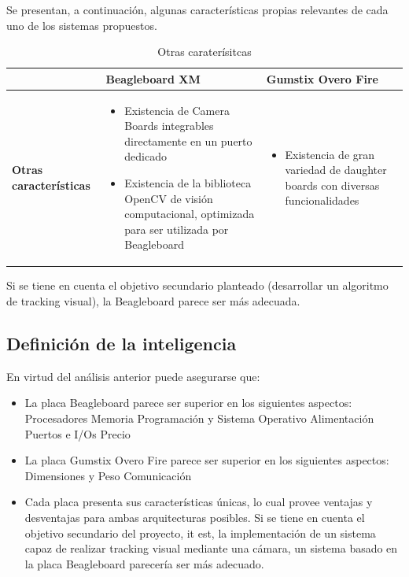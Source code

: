 \documentclass[main]{subfiles}
\begin{document}
Se presentan, a continuaci\'on, algunas caracter\'isticas propias relevantes de cada uno de los sistemas propuestos.

\begin{table}[H]
\begin{tabular}{p{130pt}|p{130pt}|p{130pt}|} 
\cline{2-3}
& \cellcolor[gray]{0.8} \textbf{Beagleboard XM} 
& \cellcolor[gray]{0.8} \textbf{Gumstix Overo Fire} \\ \cline{1-3} \hline
\multicolumn{1}{|p{130pt}|}{\cellcolor[gray]{0.8}\textbf{Otras caracter\'isticas}} 
&\begin{itemize}
\item Existencia de Camera Boards integrables directamente en un puerto dedicado
\item Existencia de la biblioteca OpenCV de visi\'on computacional, optimizada para ser utilizada por Beagleboard
\end{itemize}

&\begin{itemize}
\item Existencia de gran variedad de daughter boards con diversas funcionalidades
\end{itemize}\\ 
\hline 
\end{tabular}
\caption{Otras carater\'isitcas}
\label{tab:otras}
\end{table}

Si se tiene en cuenta el objetivo secundario  planteado (desarrollar un algoritmo de tracking visual), la Beagleboard parece ser m\'as adecuada.

\subsection{Definici\'on de la inteligencia}
\vspace*{15pt}

En virtud del an\'alisis anterior puede asegurarse que:

\begin{itemize}
\item La placa Beagleboard parece ser superior en los siguientes aspectos:
	\subitem Procesadores
	\subitem Memoria
	\subitem Programaci\'on y Sistema Operativo
	\subitem Alimentaci\'on
	\subitem Puertos e I/Os
	\subitem Precio
\item La placa Gumstix Overo Fire parece ser superior en los siguientes aspectos:
	\subitem Dimensiones y Peso
	\subitem Comunicaci\'on
\item Cada placa presenta sus caracter\'isticas \'unicas, lo cual provee ventajas y desventajas para ambas arquitecturas posibles. Si se tiene en cuenta el objetivo secundario del proyecto, it est, la implementaci\'on de un sistema capaz de realizar tracking visual mediante una c\'amara, un sistema basado en la placa Beagleboard parecer\'ia ser m\'as adecuado.
\end{itemize}
\end{document}
